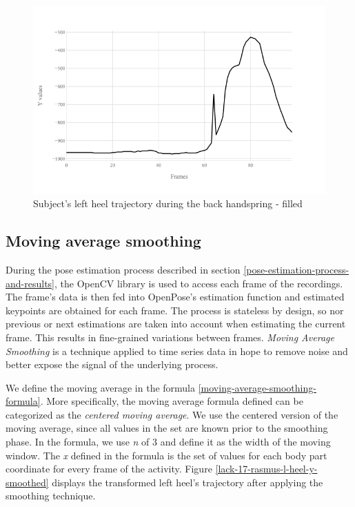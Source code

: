 \begin{figure}[htb]
  \centering
    \includegraphics[width=\textwidth,keepaspectratio]
    {images/data-preprocessing/flack-17-rasmus-l-heel-y-filled}
    \caption{Subject's left heel trajectory during the back handspring - filled}
    \label{lack-17-rasmus-l-heel-y-filled}
\end{figure}

\subsection{Moving average smoothing}

During the pose estimation process described in section \ref{pose-estimation-process-and-results}, the OpenCV library is used to access each frame of the recordings. The frame's data is then fed into OpenPose's estimation function and estimated keypoints are obtained for each frame. The process is stateless by design, so nor previous or next estimations are taken into account when estimating the current frame. This results in fine-grained variations between frames. \textit{Moving Average Smoothing} is a technique applied to time series data in hope to remove noise and better expose the signal of the underlying process.

We define the moving average in the formula \ref{moving-average-smoothing-formula}. More specifically, the moving average formula defined can be categorized as the \textit{centered moving average}. We use the centered version of the moving average, since all values in the set are known prior to the smoothing phase. In the formula, we use \textit{n} of 3 and define it as the width of the moving window. The \textit{x} defined in the formula is the set of values for each body part coordinate for every frame of the activity. Figure \ref{lack-17-rasmus-l-heel-y-smoothed} displays the transformed left heel's trajectory after applying the smoothing technique.

